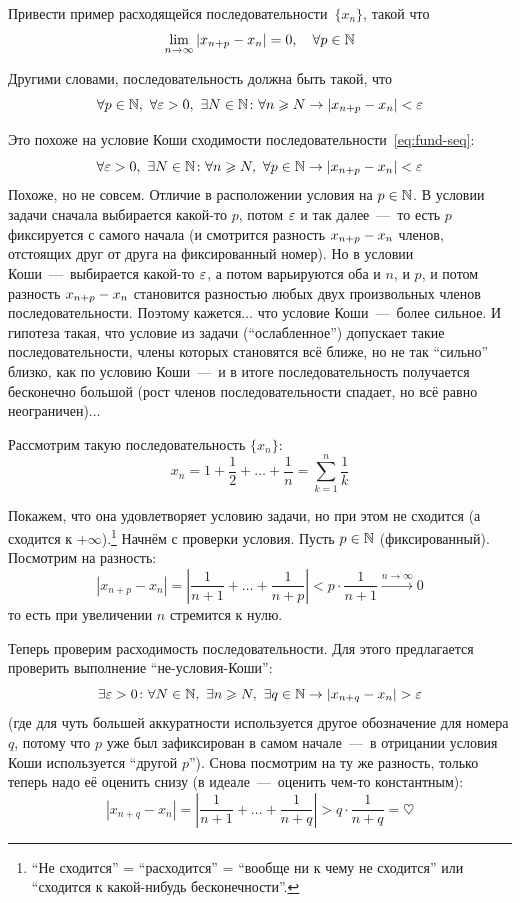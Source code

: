 \documentclass[a4paper,12pt]{article}
\begin{document}
  Привести пример расходящейся последовательности~$\{x_n\}$, такой что
  \[
    \lim_{n \to \infty} |x_{n + p} - x_{n}| = 0,\quad \forall p \in \mathbb N
  \]
  \begin{solution}
    Другими словами, последовательность должна быть такой, что
    \[
      \forall p \in \mathbb N,\ \forall \varepsilon > 0,\ \exists N \in \mathbb N\colon \forall n \geqslant N \to |x_{n + p} - x_n| < \varepsilon
    \]
    
    Это похоже на условие Коши сходимости последовательности~\eqref{eq:fund-seq}:
    \[
      \forall \varepsilon > 0,\ \exists N \in \mathbb N\colon \forall n \geqslant N,\ \forall p \in \mathbb N \to |x_{n + p} - x_n| < \varepsilon
    \]
    Похоже, но не совсем.
    Отличие в расположении условия на $p \hm\in \NN$.
    В условии задачи сначала выбирается какой-то $p$, потом $\varepsilon$ и так далее~---~то есть $p$ фиксируется с самого начала (и смотрится разность $x_{n + p} \hm- x_n$ членов, отстоящих друг от друга на фиксированный номер).
    Но в условии Коши~---~выбирается какой-то $\varepsilon$, а потом варьируются оба и $n$, и $p$, и потом разность $x_{n + p} \hm- x_n$ становится разностью любых двух произвольных членов последовательности.
    Поэтому кажется... что условие Коши~---~более сильное.
    И гипотеза такая, что условие из задачи (``ослабленное'') допускает такие последовательности, члены которых становятся всё ближе, но не так ``сильно'' близко, как по условию Коши~---~и в итоге последовательность получается бесконечно большой (рост членов последовательности спадает, но всё равно неограничен)...  %
    
    Рассмотрим такую последовательность $\{x_n\}$:
    \[
      x_n = 1 + \frac{1}{2} + \ldots + \frac{1}{n} = \sum_{k = 1}^n \frac{1}{k}
    \]
    
    Покажем, что она удовлетворяет условию задачи, но при этом не сходится (а сходится к $+\infty$).\footnote{
      ``Не сходится'' = ``расходится'' = ``вообще ни к чему не сходится'' или ``сходится к какой-нибудь бесконечности''.
    }
    Начнём с проверки условия.
    Пусть $p \hm\in \NN$ (фиксированный).
    Посмотрим на разность:
    \[
      |x_{n + p} - x_n|
        = \left|\frac{1}{n + 1} + \ldots + \frac{1}{n + p}\right|
        < p \cdot \frac{1}{n + 1} \xrightarrow{n \to \infty} 0
    \]
    то есть при увеличении $n$ стремится к нулю.
    
    Теперь проверим расходимость последовательности.
    Для этого предлагается проверить выполнение ``не-условия-Коши'':
    \[
      \exists \eps > 0\colon \forall N \in \NN,\ \exists n \geq N,\ \exists q \in \NN \to |x_{n + q} - x_n| > \eps
    \]
    (где для чуть большей аккуратности используется другое обозначение для номера $q$, потому что $p$ уже был зафиксирован в самом начале~---~в отрицании условия Коши используется ``другой $p$'').
    Снова посмотрим на ту же разность, только теперь надо её оценить снизу (в идеале~---~оценить чем-то константным):
    \[
      |x_{n + q} - x_n|
        = \left|\frac{1}{n + 1} + \ldots + \frac{1}{n + q}\right|
        > q \cdot \frac{1}{n + q} = \heartsuit
    \]
    

\end{solution}
\end{document}
